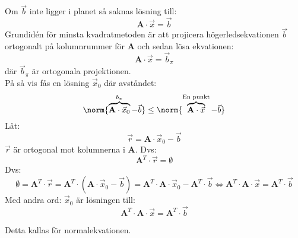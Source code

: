 Om $\vec{b}$ inte ligger i planet så saknas lösning till:
\[
    \mathbf{A} \cdot \vec{x} = \vec{b}
\]
Grundidén för minsta kvadratmetoden är att projicera högerledsekvationen $\vec{b}$ ortogonalt på kolumnrummer för \textbf{A} och sedan lösa ekvationen:
\[
    \mathbf{A} \cdot \vec{x} = \vec{b}_{\pi}
\]
där $\vec{b}_{\pi}$ är ortogonala projektionen.\\
På så vis fås en lösning $\vec{x}_0$ där avståndet:
\[
    \norm{\overbrace{\mathbf{A} \cdot \vec{x}_0}^{b_{\pi}} - \vec{b}} \le \norm{\overbrace{\mathbf{A} \cdot \vec{x}}^\text{En punkt} - \vec{b}}
\]
Låt:
\[
    \vec{r} = \mathbf{A} \cdot \vec{x}_0 - \vec{b}
\]
$\vec{r}$ är ortogonal mot kolumnerna i \textbf{A}. Dvs:
\[
    \mathbf{A}^T \cdot \vec{r} = \emptyset
\]
Dvs:
\[
    \emptyset = \mathbf{A}^T \cdot \vec{r} = \mathbf{A}^T \cdot (\mathbf{A} \cdot \vec{x}_0 - \vec{b}) = \mathbf{A}^T \cdot \mathbf{A} \cdot \vec{x}_0 - \mathbf{A}^T \cdot \vec{b} \Leftrightarrow \mathbf{A}^T \cdot \mathbf{A} \cdot \vec{x} = \mathbf{A}^T \cdot \vec{b}
\]
Med andra ord: $\vec{x}_0$ är lösningen till:
\[
    \mathbf{A}^T \cdot \mathbf{A} \cdot \vec{x} = \mathbf{A}^T \cdot \vec{b}
\]
\begin{Rem}
    Detta kallas för normalekvationen.
\end{Rem}
